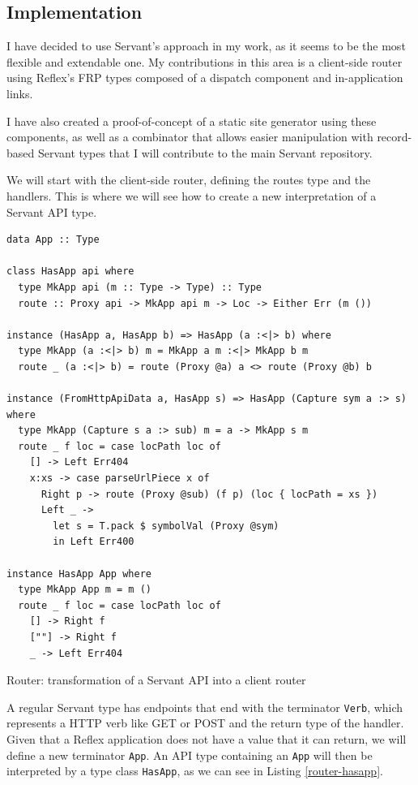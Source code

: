 \documentclass[english,zadani,odsaz]{fitthesis}
\begin{document}
\subsection{Implementation}
\label{sec:orgecf03fa}
I have decided to use Servant's approach in my work, as it seems to be the most
flexible and extendable one. My contributions in this area is a client-side
router using Reflex's FRP types composed of a dispatch component and
in-application links.

I have also created a proof-of-concept of a static site generator using these
components, as well as a combinator that allows easier manipulation with
record-based Servant types that I will contribute to the main Servant
repository.

We will start with the client-side router, defining the routes type and the
handlers. This is where we will see how to create a new interpretation of a
Servant API type.

\begin{listing}[!t]
\begin{verbatim}
data App :: Type

class HasApp api where
  type MkApp api (m :: Type -> Type) :: Type
  route :: Proxy api -> MkApp api m -> Loc -> Either Err (m ())

instance (HasApp a, HasApp b) => HasApp (a :<|> b) where
  type MkApp (a :<|> b) m = MkApp a m :<|> MkApp b m
  route _ (a :<|> b) = route (Proxy @a) a <> route (Proxy @b) b

instance (FromHttpApiData a, HasApp s) => HasApp (Capture sym a :> s) where
  type MkApp (Capture s a :> sub) m = a -> MkApp s m
  route _ f loc = case locPath loc of
    [] -> Left Err404
    x:xs -> case parseUrlPiece x of
      Right p -> route (Proxy @sub) (f p) (loc { locPath = xs })
      Left _ ->
        let s = T.pack $ symbolVal (Proxy @sym)
        in Left Err400

instance HasApp App where
  type MkApp App m = m ()
  route _ f loc = case locPath loc of
    [] -> Right f
    [""] -> Right f
    _ -> Left Err404
\end{verbatim}
\caption{Router: transformation of a Servant API into a client router \label{router-hasapp}}
\end{listing}

A regular Servant type has endpoints that end with the terminator \texttt{Verb}, which
represents a HTTP verb like GET or POST and the return type of the
handler. Given that a Reflex application does not have a value that it can
return, we will define a new terminator \texttt{App}. An API type containing an \texttt{App} will
then be interpreted by a type class \texttt{HasApp}, as we can see in Listing
\ref{router-hasapp}.
\end{document}
